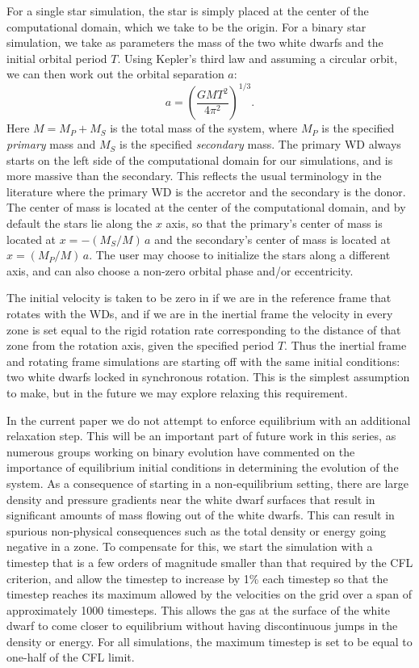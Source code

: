 \documentclass[iop,numberedappendix]{../emulateapj}
\begin{document}
For a single star simulation, the star is simply placed at the center
of the computational domain, which we take to be the origin. For a
binary star simulation, we take as parameters the mass of the two
white dwarfs and the initial orbital period $T$. Using Kepler's third
law and assuming a circular orbit, we can then work out the orbital
separation $a$:
\begin{equation}
  a = \left(\frac{GM T^2}{4\pi^2}\right)^{1/3}.
\end{equation}
Here $M = M_P + M_S$ is the total mass of the system, where $M_P$ is
the specified \textit{primary} mass and $M_S$ is the specified
\textit{secondary} mass. The primary WD always starts on the left
side of the computational domain for our simulations, and is more
massive than the secondary. This reflects the usual terminology in the
literature where the primary WD is the accretor and the secondary is
the donor. The center of mass is located at the center of the
computational domain, and by default the stars lie along the $x$ axis, so that
the primary's center of mass is located at $x = -(M_S / M)\, a$ and
the secondary's center of mass is located at $x = (M_P / M)\, a$.
The user may choose to initialize the stars along a different axis,
and can also choose a non-zero orbital phase and/or eccentricity.

The initial velocity is taken to be zero in if we are in the reference
frame that rotates with the WDs, and if we are in the inertial frame
the velocity in every zone is set equal to the rigid rotation rate 
corresponding to the distance of that zone from the rotation axis, given
the specified period $T$. Thus the inertial frame and rotating frame 
simulations are starting off with the same initial conditions: two white 
dwarfs locked in synchronous rotation. This is the simplest assumption to 
make, but in the future we may explore relaxing this requirement.

In the current paper we do not attempt to enforce equilibrium with an additional relaxation
step. This will be an important part of future work in this series, as
numerous groups working on binary evolution
\citep{swc:2000,motl:2002,rosswog:2004,dan:2011,pakmor:2012:gadget}
have commented on the importance of equilibrium initial conditions in
determining the evolution of the system. As a consequence of starting 
in a non-equilibrium setting, there are 
large density and pressure gradients near the white dwarf surfaces
that result in significant amounts of mass flowing out of the white dwarfs.
This can result in spurious non-physical consequences such as 
the total density or energy going negative in a zone. To compensate 
for this, we start the simulation with a timestep that is a few orders 
of magnitude smaller than that required by the CFL criterion, and allow
the timestep to increase by 1\% each timestep so that the timestep reaches 
its maximum allowed by the velocities on the grid over a span of approximately 
1000 timesteps. This allows the gas at the surface of the white dwarf
to come closer to equilibrium without having 
discontinuous jumps in the density or energy. For all simulations, 
the maximum timestep is set to be equal to one-half of the CFL limit.
\end{document}

